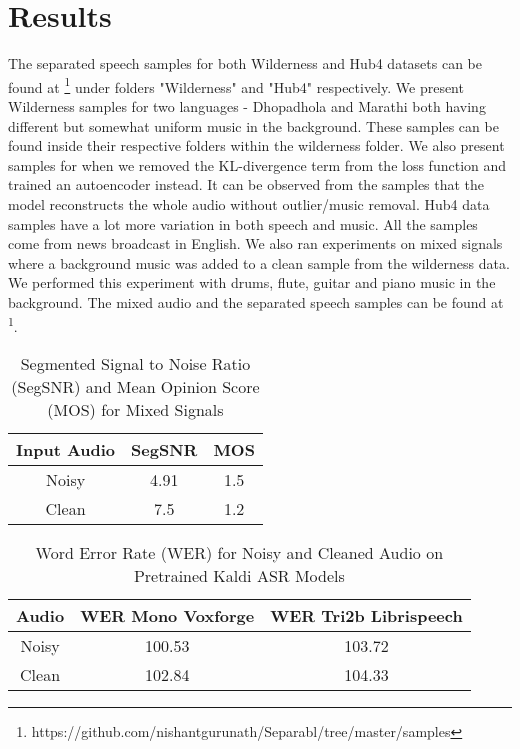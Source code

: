 
\section{Results}
The separated speech samples for both Wilderness and Hub4 datasets can be found at \footnote[1]{https://github.com/nishantgurunath/Separabl/tree/master/samples}
under folders "Wilderness" and "Hub4" respectively. We present Wilderness samples for two languages - Dhopadhola and Marathi both having different but somewhat uniform music in the background. These samples can be found inside their respective folders within the wilderness folder. We also present samples for when we removed the KL-divergence term from the loss function and trained an autoencoder instead. It can be observed from the samples that the model reconstructs the whole audio without outlier/music removal. Hub4 data samples have a lot more variation in both speech and music. All the samples come from news broadcast in English. We also ran experiments on mixed signals where a background music was added to a clean sample from the wilderness data. We performed this experiment with drums, flute, guitar and piano music in the background. 
The mixed audio and the separated speech samples can be found at \textsuperscript{\rm 1}.\\ 
\begin{table}[h!]
    \centering
    \begin{tabular}{|c|c|c|}
    \hline
     \textbf{Input Audio} & \textbf{SegSNR} & \textbf{MOS} \\
     \hline
     Noisy &  4.91 & 1.5 \\
     \hline
     Clean & 7.5 & 1.2\\
     \hline
    \end{tabular}
    \caption{Segmented Signal to Noise Ratio (SegSNR) and Mean Opinion Score (MOS) for Mixed Signals}
    \label{tab:my_label}
\end{table}

\begin{table}[h!]
    \centering
    \begin{tabular}{|c|c|c|}
    \hline
     \textbf{Audio} & \textbf{WER Mono Voxforge} &  \textbf{WER Tri2b Librispeech}\\
     \hline
     Noisy &  100.53 & 103.72 \\
     \hline
     Clean & 102.84 &  104.33 \\
     \hline
    \end{tabular}
    \caption{Word Error Rate (WER) for Noisy and Cleaned Audio on Pretrained Kaldi ASR Models}
    \label{tab:my_label}
\end{table}

